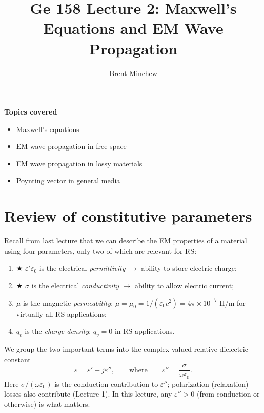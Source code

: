 \documentclass[11pt, oneside]{article}
\title{Ge 158 Lecture 2: Maxwell's Equations and EM Wave Propagation}
\author{Brent Minchew}
\date{}
\begin{document}
\maketitle

\noindent\textbf{Topics covered}
\begin{itemize}
	\item Maxwell's equations
	\item EM wave propagation in free space
	\item EM wave propagation in lossy materials
	\item Poynting vector in general media
\end{itemize}

\section{Review of constitutive parameters}

Recall from last lecture that we can describe the EM properties of a material using four parameters, only two of which are relevant for RS:
\begin{enumerate}
	\item $\bigstar$ $\varepsilon'\varepsilon_0$ is the electrical \emph{permittivity} $\rightarrow$ ability to store electric charge;
	\item $\bigstar$ $\sigma$ is the electrical \emph{conductivity} $\rightarrow$ ability to allow electric current;
	\item $\mu$ is the magnetic \emph{permeability}; $\mu = \mu_0 = 1/(\varepsilon_0 c^2) = 4\pi\times10^{-7}$ H/m for virtually all RS applications;
	\item $q_v$ is the \emph{charge density}; $q_v = 0$ in RS applications.
\end{enumerate}
We group the two important terms into the complex-valued relative dielectric constant
\begin{equation}
	\label{e:dielectric}
	\varepsilon = \varepsilon' - j\varepsilon'', \qquad \text{where} \qquad \varepsilon'' = \frac{\sigma}{\omega\varepsilon_0}.
\end{equation}
Here $\sigma/(\omega\varepsilon_0)$ is the conduction contribution to $\varepsilon''$; polarization (relaxation) losses also contribute (Lecture 1). In this lecture, any $\varepsilon'' > 0$ (from conduction or otherwise) is what matters.
\end{document}
